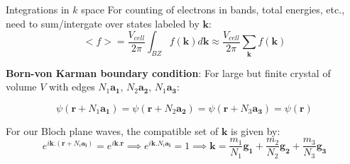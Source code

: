 \documentclass[aspectratio=169]{beamer}
\let \vec \mathbf
\begin{document}
\begin{frame}{Integrations in $k$ space}
For counting of electrons in bands, total energies, etc., need to sum/intergate over states labeled by $\vec{k}$:
\begin{equation*}
<f> = \frac{V_{cell}}{2\pi} \int_{BZ} f(\vec{k}) d\vec{k} \approx \frac{V_{cell}}{2\pi} \sum_{\vec{k}} f(\vec{k})
\end{equation*} 

\textbf{Born-von Karman boundary condition}: For large but finite crystal of volume $V$ with edges $N_1 \vec{a_1}$, $N_2 \vec{a_2}$, $N_1 \vec{a_3}$:

\begin{equation*}
\psi(\vec{r} + N_1 \vec{a_1}) = \psi(\vec{r} + N_2 \vec{a_2}) = \psi(\vec{r} + N_3 \vec{a_3}) = \psi(\vec{r})
\end{equation*} 

For our Bloch plane waves, the compatible set of $\vec{k}$ is given by:
\begin{equation*}
e^{i\vec{k}.(\vec{r} + N_i \vec{a_i})} = e^{i\vec{k}.\vec{r}}\implies e^{i\vec{k}.N_i \vec{a_i}} = 1 \implies \vec{k} = \frac{m_1}{N_1} \vec{g_1} +  \frac{m_2}{N_2} \vec{g_2} +\frac{m_3}{N_3} \vec{g_3}
\end{equation*} 

\end{frame} 
\end{document}
